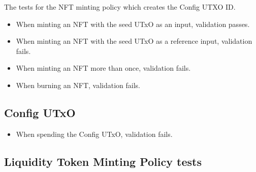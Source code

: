 \documentclass{article}
\begin{document}
The tests for the NFT minting policy which creates the Config UTXO ID.
\begin{itemize}
	\item When minting an NFT with the seed UTxO as an input, validation passes.
	\item When minting an NFT with the seed UTxO as a reference input, validation fails.
	\item When minting an NFT more than once, validation fails.
	\item When burning an NFT, validation fails.
\end{itemize}

\subsection*{Config UTxO}

\begin{itemize}
	\item When spending the Config UTxO, validation fails.
\end{itemize}

\subsection*{Liquidity Token Minting Policy tests}
\end{document}
